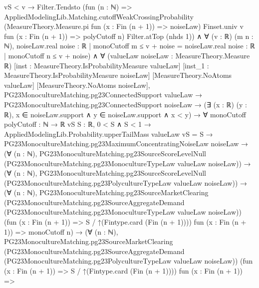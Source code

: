 \documentclass[10pt]{article}
\begin{document}
\begin{ReviewVerbatim}
                              vS < v →
                                Filter.Tendsto
                                  (fun (n : ℕ) =>
                                    AppliedModelingLib.Matching.cutoffWeakCrossingProbability
                                      (MeasureTheory.Measure.pi fun (x : Fin (n + 1)) => noiseLaw) Finset.univ v
                                      fun (x : Fin (n + 1)) => polyCutoff n)
                                  Filter.atTop (nhds 1)) ∧
                            ∀ (v : ℝ) (m n : ℕ),
                              noiseLaw.real {noise : ℝ | monoCutoff m ≤ v + noise} =
                                noiseLaw.real {noise : ℝ | monoCutoff n ≤ v + noise}) ∧
  ∀ (valueLaw noiseLaw : MeasureTheory.Measure ℝ) [inst : MeasureTheory.IsProbabilityMeasure valueLaw]
    [inst_1 : MeasureTheory.IsProbabilityMeasure noiseLaw] [MeasureTheory.NoAtoms valueLaw]
    [MeasureTheory.NoAtoms noiseLaw],
    PG23MonocultureMatching.pg23ConnectedSupport valueLaw →
      PG23MonocultureMatching.pg23ConnectedSupport noiseLaw →
        (∃ (x : ℝ) (y : ℝ), x ∈ noiseLaw.support ∧ y ∈ noiseLaw.support ∧ x < y) →
          ∀ {monoCutoff polyCutoff : ℕ → ℝ} {vS S : ℝ},
            0 < S ∧ S < 1 →
              AppliedModelingLib.Probability.upperTailMass valueLaw vS = S →
                PG23MonocultureMatching.pg23MaximumConcentratingNoiseLaw noiseLaw →
                  (∀ (n : ℕ),
                      PG23MonocultureMatching.pg23SourceScoreLevelNull
                        (PG23MonocultureMatching.pg23MonocultureTypeLaw valueLaw noiseLaw)) →
                    (∀ (n : ℕ),
                        PG23MonocultureMatching.pg23SourceScoreLevelNull
                          (PG23MonocultureMatching.pg23PolycultureTypeLaw valueLaw noiseLaw)) →
                      (∀ (n : ℕ),
                          PG23MonocultureMatching.pg23SourceMarketClearing
                            (PG23MonocultureMatching.pg23SourceAggregateDemand
                              (PG23MonocultureMatching.pg23MonocultureTypeLaw valueLaw noiseLaw))
                            (fun (x : Fin (n + 1)) => S / ↑(Fintype.card (Fin (n + 1)))) fun (x : Fin (n + 1)) =>
                            monoCutoff n) →
                        (∀ (n : ℕ),
                            PG23MonocultureMatching.pg23SourceMarketClearing
                              (PG23MonocultureMatching.pg23SourceAggregateDemand
                                (PG23MonocultureMatching.pg23PolycultureTypeLaw valueLaw noiseLaw))
                              (fun (x : Fin (n + 1)) => S / ↑(Fintype.card (Fin (n + 1)))) fun (x : Fin (n + 1)) =>

\end{ReviewVerbatim}
\end{document}
